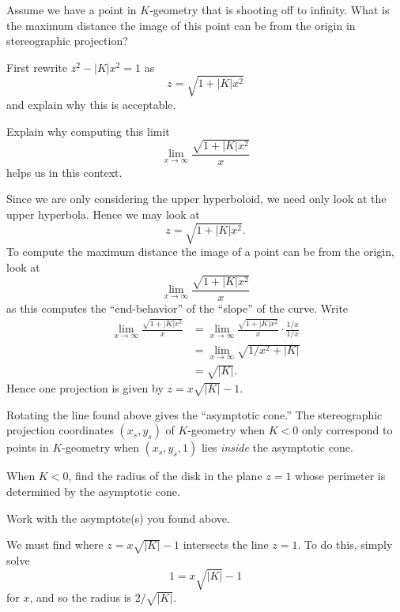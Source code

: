\documentclass{ximera}
\begin{document}
\begin{problem}
  Assume we have a point in $K$-geometry that is shooting off to
  infinity. What is the maximum distance the image of this point can
  be from the origin in stereographic projection?
  \begin{hint}
    First rewrite $z^{2}-|K|x^{2} =1$ as
    \[
    z = \sqrt{1+|K|x^2}
    \]
    and explain why this is acceptable.
  \end{hint}
  \begin{hint}
    Explain why computing this limit
    \[
    \lim_{x\to \infty} \frac{\sqrt{1+|K|x^2}}{x}
    \]
    helps us in this context.
  \end{hint}
  \begin{freeResponse}
    Since we are only considering the upper hyperboloid, we need only
    look at the upper hyperbola. Hence we may look at
     \[
    z = \sqrt{1+|K|x^2}.
    \]
    To compute the maximum distance the image of a point can be from
    the origin, look at 
    \[
    \lim_{x\to \infty} \frac{\sqrt{1+|K|x^2}}{x}
    \]
    as this computes the ``end-behavior'' of the ``slope'' of the
    curve. Write
    \begin{align*}
      \lim_{x\to \infty} \frac{\sqrt{1+|K|x^2}}{x} &= \lim_{x\to \infty} \frac{\sqrt{1+|K|x^2}}{x}\cdot \frac{1/x}{1/x}\\
      &= \lim_{x\to \infty} \sqrt{1/x^2+|K|}\\
      &= \sqrt{|K|}.
    \end{align*}
    Hence one projection is given by $z = x\sqrt{|K|}-1$.
  \end{freeResponse}
\end{problem}


Rotating the line found above gives the ``asymptotic cone.'' The
stereographic projection coordinates $(x_{s},y_{s})$ of $K$-geometry
when $K<0$ only correspond to points in $K$-geometry when
$(x_{s},y_{s},1)$ lies \textit{inside} the asymptotic cone.

\begin{problem}
  When $K<0$, find the radius of the disk in the plane $z=1$ whose
  perimeter is determined by the asymptotic cone. 
  \begin{hint}
    Work with the asymptote(s) you found above.
  \end{hint}
  \begin{freeResponse}
    We must find where $z = x\sqrt{|K|}-1$ intersects the line $z=1$. To do this, simply solve
    \[
    1 = x\sqrt{|K|}-1
    \]
    for $x$, and so the radius is $2/\sqrt{|K|}$.
  \end{freeResponse}
\end{problem}
\end{document}
